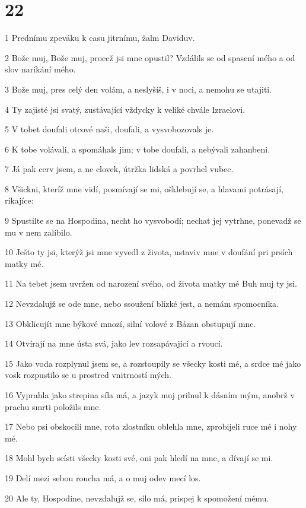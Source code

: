 \chapter{22}

\par 1 Prednímu zpeváku k casu jitrnímu, žalm Daviduv.
\par 2 Bože muj, Bože muj, procež jsi mne opustil? Vzdálils se od spasení mého a od slov naríkání mého.
\par 3 Bože muj, pres celý den volám, a neslyšíš, i v noci, a nemohu se utajiti.
\par 4 Ty zajisté jsi svatý, zustávající vždycky k veliké chvále Izraelovi.
\par 5 V tobet doufali otcové naši, doufali, a vysvobozovals je.
\par 6 K tobe volávali, a spomáhals jim; v tobe doufali, a nebývali zahanbeni.
\par 7 Já pak cerv jsem, a ne clovek, útržka lidská a povrhel vubec.
\par 8 Všickni, kteríž mne vidí, posmívají se mi, ošklebují se, a hlavami potrásají, ríkajíce:
\par 9 Spustilte se na Hospodina, necht ho vysvobodí; nechat jej vytrhne, ponevadž se mu v nem zalíbilo.
\par 10 Ješto ty jsi, kterýž jsi mne vyvedl z života, ustaviv mne v doufání pri prsích matky mé.
\par 11 Na tebet jsem uvržen od narození svého, od života matky mé Buh muj ty jsi.
\par 12 Nevzdalujž se ode mne, nebo ssoužení blízké jest, a nemám spomocníka.
\par 13 Obklicujít mne býkové mnozí, silní volové z Bázan obstupují mne.
\par 14 Otvírají na mne ústa svá, jako lev rozsapávající a rvoucí.
\par 15 Jako voda rozplynul jsem se, a rozstoupily se všecky kosti mé, a srdce mé jako vosk rozpustilo se u prostred vnitrností mých.
\par 16 Vyprahla jako strepina síla má, a jazyk muj prilnul k dásním mým, anobrž v prachu smrti položils mne.
\par 17 Nebo psi obskocili mne, rota zlostníku oblehla mne, zprobijeli ruce mé i nohy mé.
\par 18 Mohl bych scísti všecky kosti své, oni pak hledí na mne, a dívají se mi.
\par 19 Delí mezi sebou roucha má, a o muj odev mecí los.
\par 20 Ale ty, Hospodine, nevzdalujž se, sílo má, prispej k spomožení mému.
